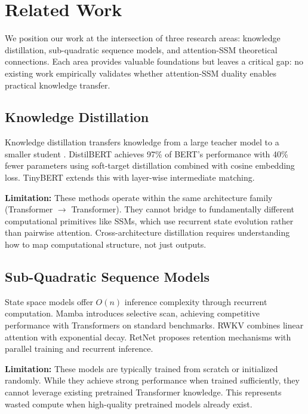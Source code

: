 \section{Related Work}
\label{sec:related_work}

We position our work at the intersection of three research areas: knowledge distillation, sub-quadratic sequence models, and attention-SSM theoretical connections. Each area provides valuable foundations but leaves a critical gap: no existing work empirically validates whether attention-SSM duality enables practical knowledge transfer.

\subsection{Knowledge Distillation}

Knowledge distillation transfers knowledge from a large teacher model to a smaller student \cite{hinton2015distilling}. DistilBERT \cite{sanh2019distilbert} achieves 97\% of BERT's performance with 40\% fewer parameters using soft-target distillation combined with cosine embedding loss. TinyBERT \cite{jiao2020tinybert} extends this with layer-wise intermediate matching.

\textbf{Limitation:} These methods operate within the same architecture family (Transformer $\rightarrow$ Transformer). They cannot bridge to fundamentally different computational primitives like SSMs, which use recurrent state evolution rather than pairwise attention. Cross-architecture distillation requires understanding how to map computational structure, not just outputs.

\subsection{Sub-Quadratic Sequence Models}

State space models offer $O(n)$ inference complexity through recurrent computation. Mamba \cite{gu2023mamba} introduces selective scan, achieving competitive performance with Transformers on standard benchmarks. RWKV \cite{peng2023rwkv} combines linear attention with exponential decay. RetNet \cite{sun2023retnet} proposes retention mechanisms with parallel training and recurrent inference.

\textbf{Limitation:} These models are typically trained from scratch or initialized randomly. While they achieve strong performance when trained sufficiently, they cannot leverage existing pretrained Transformer knowledge. This represents wasted compute when high-quality pretrained models already exist.

